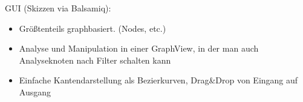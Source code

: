 \documentclass{article}
\begin{document}
GUI (Skizzen via Balsamiq):
\begin{itemize}
  \item Größtenteils graphbasiert. (Nodes, etc.)
  \item Analyse und Manipulation in einer GraphView, in der man auch Analyseknoten nach Filter schalten kann
  \item Einfache Kantendarstellung als Bezierkurven, Drag\&Drop von Eingang auf Ausgang

\end{itemize}
\end{document}
